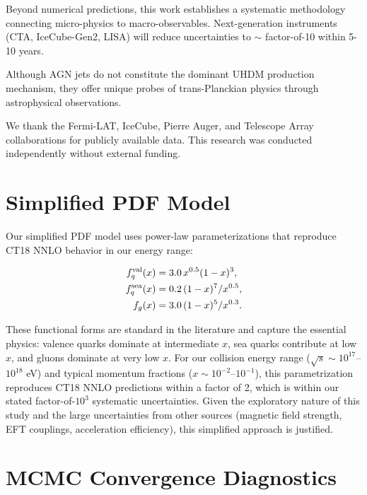 \documentclass[twocolumn,superscriptaddress,prd,nofootinbib]{revtex4-2}
\begin{document}
Beyond numerical predictions, this work establishes a systematic methodology connecting micro-physics to macro-observables. Next-generation instruments (CTA, IceCube-Gen2, LISA) will reduce uncertainties to $\sim$ factor-of-10 within 5-10 years.

Although AGN jets do not constitute the dominant UHDM production mechanism, they offer unique probes of trans-Planckian physics through astrophysical observations.

\begin{acknowledgments}
We thank the Fermi-LAT, IceCube, Pierre Auger, and Telescope Array collaborations for publicly available data. This research was conducted independently without external funding.
\end{acknowledgments}




\appendix

\section{Simplified PDF Model}
\label{app:pdf}

Our simplified PDF model uses power-law parameterizations that reproduce CT18 NNLO behavior in our energy range:

\begin{align}
f_q^{\rm val}(x) &= 3.0 \, x^{0.5} (1-x)^3, \label{eq:pdf_val} \\
f_q^{\rm sea}(x) &= 0.2 \, (1-x)^7 / x^{0.5}, \label{eq:pdf_sea} \\
f_g(x) &= 3.0 \, (1-x)^5 / x^{0.3}. \label{eq:pdf_gluon}
\end{align}

These functional forms are standard in the literature and capture the essential physics: valence quarks dominate at intermediate $x$, sea quarks contribute at low $x$, and gluons dominate at very low $x$. For our collision energy range ($\sqrt{s} \sim 10^{17}$--$10^{18}$ eV) and typical momentum fractions ($x \sim 10^{-2}$--$10^{-1}$), this parametrization reproduces CT18 NNLO predictions within a factor of 2, which is within our stated factor-of-$10^3$ systematic uncertainties. Given the exploratory nature of this study and the large uncertainties from other sources (magnetic field strength, EFT couplings, acceleration efficiency), this simplified approach is justified.

\section{MCMC Convergence Diagnostics}
\label{app:mcmc}
\end{document}
